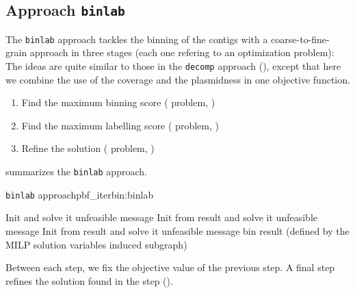 \subsection{Approach \texttt{binlab}}\label{sec:pbf_iterbin:binlab}

The \texttt{binlab} approach tackles the binning of the contigs with a coarse-to-fine-grain approach in three stages (each one refering to an optimization problem):
The ideas are quite similar to those in the \texttt{decomp} approach (), except that here we combine the use of the coverage and the plasmidness in one objective function.

\begin{enumerate}[label=\roman*.]
  \item Find the maximum binning score (\MBS{} problem, )
  \item Find the maximum labelling score (\MLS{} problem, )
  \item Refine the solution (\MRBS{} problem, )
\end{enumerate}

 summarizes the \texttt{binlab} approach.

\begin{tcbalgo}{\texttt{binlab} approach}{pbf_iterbin:binlab}
  \begin{algorithmic}[1]
    \State{} Init \MBS{} and solve it
    \State{} \Return{}unfeasible message
    \EndIf{}
    \State{} Init \MLS{} from \MBS{} result and solve it
    \State{} \Return{}unfeasible message
    \EndIf{}
    \State{} Init \MRBS{} from \MLS{} result and solve it
    \State{} \Return{}unfeasible message
    \EndIf{}
    \State{} \Return{}\MRBS{} bin result (defined by the MILP solution variables induced subgraph)
    \EndFunction{}
  \end{algorithmic}
\end{tcbalgo}

Between each step, we fix the objective value of the previous step.
A final step refines the solution found in the \MLS{} step ().



